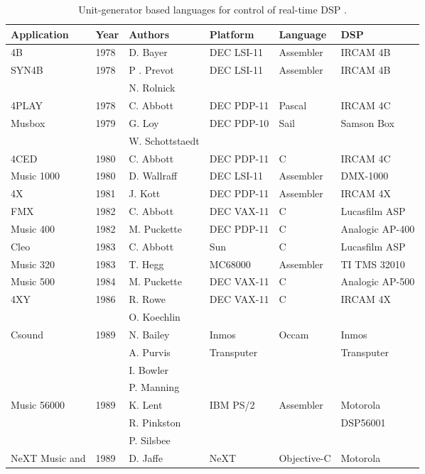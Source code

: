 \begin{table}[htbp]
	\label{tab:realtime}
	\caption{Unit­-generator ­based languages for control of real-­time DSP \cite[807-808]{Roads1995}.}
	\centering
	\vspace{12pt}
	\begin{tabular}{ *{6}{l} }
		\hline
		Application & Year & Authors & Platform & Language & DSP \\
		\hline
		4B & 1978 & D. Bayer & DEC LSI­-11 & Assembler & IRCAM 4B \\
		SYN4B & 1978 & P . Prevot & DEC LSI­-11 & Assembler & IRCAM 4B \\
		& & N. Rolnick & & & \\
		4PLAY & 1978 & C. Abbott & DEC PDP­-11 & Pascal & IRCAM 4C \\
		Musbox & 1979 & G. Loy & DEC PDP­-10 & Sail & Samson Box \\
		& & W. Schottstaedt & & & \\
		4CED & 1980 & C. Abbott & DEC PDP­-11 & C & IRCAM 4C \\
		Music 1000 & 1980 & D. Wallraff & DEC LSI­-11 & Assembler & DMX­-1000 \\
		4X & 1981 & J. Kott & DEC PDP­-11 & Assembler & IRCAM 4X \\
		FMX & 1982 & C. Abbott & DEC VAX-11 & C & Lucasfilm ASP \\
		Music 400 & 1982 & M. Puckette & DEC PDP-11 & C & Analogic AP­-400 \\
		Cleo & 1983 & C. Abbott & Sun & C & Lucasfilm ASP \\
		Music 320 & 1983 & T. Hegg & MC68000 & Assembler & TI TMS 32010 \\
		Music 500 & 1984 & M. Puckette & DEC VAX­-11 & C & Analogic AP­-500 \\
		4XY & 1986 & R. Rowe & DEC VAX-11 & C & IRCAM 4X \\
		& & O. Koechlin & & & \\
		Csound & 1989 & N. Bailey & Inmos & Occam & Inmos \\
		& & A. Purvis & Transputer & & Transputer \\
		& & I. Bowler & & & \\
		& & P. Manning & & & \\
		Music 56000 & 1989 & K. Lent & IBM PS/2 & Assembler & Motorola \\
		& & R. Pinkston & & & DSP56001 \\
		& & P. Silsbee & & & \\
		NeXT Music and & 1989 & D. Jaffe & NeXT & Objective-C & Motorola \\

\end{tabular}
\end{table}
